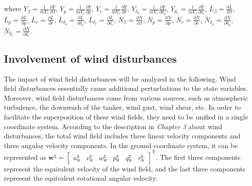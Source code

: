 where ${Y_\beta } = \frac{1}{{m{V_r}}}\frac{{\partial \bar Y}}{{\partial \beta }}$, ${Y_p} = \frac{1}{{m{V_r}}}\frac{{\partial \bar Y}}{{\partial p}}$, ${Y_r} = \frac{1}{{m{V_r}}}\frac{{\partial \bar Y}}{{\partial r}}$, ${Y_{{\delta _a}}} = \frac{1}{{m{V_r}}}\frac{{\partial \bar Y}}{{\partial {\delta _a}}}$, ${Y_{{\delta _r}}} = \frac{1}{{m{V_r}}}\frac{{\partial \bar Y}}{{\partial {\delta _r}}}$, ${\bar L_\beta } = \frac{{\partial \bar L}}{{\partial \beta }}$,
${\bar L_p} = \frac{{\partial \bar L}}{{\partial p}}$, ${\bar L_r} = \frac{{\partial \bar L}}{{\partial r}}$, ${\bar L_{{\delta _a}}} = \frac{{\partial \bar L}}{{\partial {\delta _a}}}$, ${\bar L_{{\delta _r}}} = \frac{{\partial \bar L}}{{\partial {\delta _r}}}$, ${\bar N_\beta } = \frac{{\partial \bar N}}{{\partial \beta }}$, ${\bar N_p} = \frac{{\partial \bar N}}{{\partial p}}$, ${\bar N_r} = \frac{{\partial \bar N}}{{\partial r}}$, ${\bar N_{{\delta _a}}} = \frac{{\partial \bar N}}{{\partial {\delta _a}}}$, ${\bar N_{{\delta _r}}} = \frac{{\partial \bar N}}{{\partial {\delta _r}}}$.

\subsection{Involvement of wind disturbances}
The impact of wind field disturbances will be analyzed in the following. Wind field disturbances essentially cause additional perturbations to the state variables. Moreover, wind field disturbances come from various sources, such as atmospheric turbulence, the downwash of the tanker, wind gust, wind shear, etc. In order to facilitate the superposition of these wind fields, they need to be unified in a single coordinate system.
According to the description in \textit{Chapter 3} about wind disturbances, the total wind field includes three linear velocity components and three angular velocity components. In the ground coordinate system, it can be represented as ${\mathbf{w}\mathrm{^g}} = {\left[ {\begin{array}{*{20}{c}}
		{u\mathrm{_w^g}}&{v\mathrm{_w^g}}&{w\mathrm{_w^g}}&{p\mathrm{_w^g}}&{q\mathrm{_w^g}}&{r\mathrm{_w^g}}
		\end{array}} \right]^\mathrm{T}}$. The first three components represent the equivalent velocity of the wind field, and the last three components represent the equivalent rotational angular velocity.

